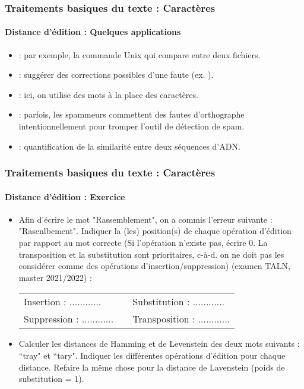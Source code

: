 \documentclass[xcolor=table]{beamer}
\begin{document}
\begin{frame}
\frametitle{Traitements basiques du texte : Caractères}
\framesubtitle{Distance d'édition : Quelques applications}

\begin{itemize}
	\item {} : par exemple, la commande Unix  qui compare entre deux fichiers.
	\item {} : suggérer des corrections possibles d'une faute (ex. ).
	\item {} : ici, on utilise des mots à la place des caractères.
	\item {} : parfois, les spammeurs commettent des fautes d'orthographe intentionnellement pour tromper l'outil de détection de spam.
	\item {} : quantification de la similarité entre deux séquences d'ADN.
\end{itemize}

\end{frame}

\begin{frame}
	\frametitle{Traitements basiques du texte : Caractères}
	\framesubtitle{Distance d'édition : Exercice}
	
	\begin{itemize}
		\item Afin d'écrire le mot "Rassemblement",  on a commis l'erreur suivante : "Rasenlbement". Indiquer la (les) position(s) de chaque opération d'édition par rapport au mot correcte (Si l'opération n'existe pas, écrire 0. La transposition et la substitution sont prioritaires, c-à-d. on ne doit pas les considérer comme des opérations d'insertion/suppression) (examen TALN, master 2021/2022) :
		\begin{tabular}{|lll|}
			\hline 
			Insertion : ............ & & Substitution : ............ \\
			Suppression : ............ & & Transposition : ............ \\
			\hline
		\end{tabular}
		
		\item Calculer les distances de Hamming et de  Levenstein des deux mots suivants : ``tray" et ``tary".
		Indiquer les différentes opérations d'édition pour chaque distance. Refaire la même chose pour la distance de Lavenstein (poids de substitution = 1).
	\end{itemize}
	
\end{frame}
\end{document}
